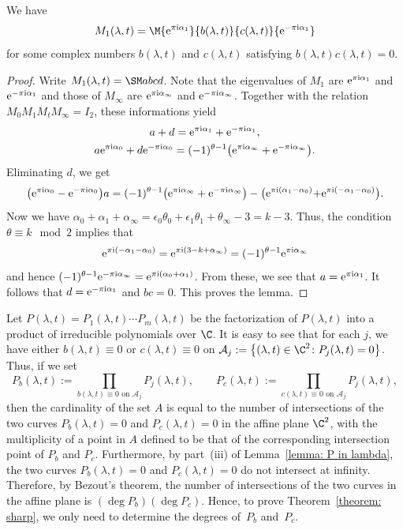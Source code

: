 \begin{Lemma} We have
\[
M_1(\lambda,t)=\M{{\rm e}^{\pi {\rm i}\alpha_1}}{b(\lambda,t)}{c(\lambda,t)}
{{\rm e}^{-\pi {\rm i}\alpha_1}}
\]
for some complex numbers $b(\lambda,t)$ and $c(\lambda,t)$ satisfying
$b(\lambda,t)c(\lambda,t)=0$.
\end{Lemma}

\begin{proof} Write $M_1(\lambda,t)=\SM abcd$. Note that the
 eigenvalues of $M_1$ are ${\rm e}^{\pi {\rm i}\alpha_1}$ and ${\rm e}^{-\pi
 {\rm i}\alpha_1}$ and those of $M_\infty$ are ${\rm e}^{\pi {\rm i}\alpha_\infty}$
 and ${\rm e}^{-\pi {\rm i}\alpha_\infty}$. Together with the relation
 $M_0M_1M_tM_\infty=I_2$, these informations yield
 \begin{gather*}
 a+d={\rm e}^{\pi {\rm i}\alpha_1}+{\rm e}^{-\pi {\rm i}\alpha_1}, \\
 a{\rm e}^{\pi {\rm i}\alpha_0}+d{\rm e}^{-\pi {\rm i}\alpha_0}
 =(-1)^{\theta-1}\bigl({\rm e}^{\pi {\rm i}\alpha_\infty}+{\rm e}^{-\pi {\rm i}\alpha_\infty}\bigr).
 \end{gather*}
 Eliminating $d$, we get
\[
 \bigl({\rm e}^{\pi {\rm i}\alpha_0}-{\rm e}^{-\pi {\rm i}\alpha_0}\bigr)a
 =(-1)^{\theta-1}\bigl({\rm e}^{\pi {\rm i}\alpha_\infty}+{\rm e}^{-\pi {\rm i}\alpha_\infty}\bigr)
 -\bigl({\rm e}^{\pi {\rm i}(\alpha_1-\alpha_0)}{+{\rm e}^{\pi {\rm i}(-\alpha_1-\alpha_0)}}\bigr).
\]
 Now we have $\alpha_0+\alpha_1+\alpha_\infty=\epsilon_0\theta_0
 +\epsilon_1\theta_1+\theta_\infty-3=k-3$. Thus, the condition
 $\theta\equiv k\mod 2$ implies that
\[
 {\rm e}^{\pi {\rm i}(-\alpha_1-\alpha_0)}={\rm e}^{\pi {\rm i}(3-k+\alpha_\infty)}
 =(-1)^{\theta-1}{\rm e}^{\pi {\rm i}\alpha_\infty}
\]
 and hence $(-1)^{\theta-1}{\rm e}^{-\pi {\rm i}\alpha_\infty}
 ={\rm e}^{\pi {\rm i}(\alpha_0+\alpha_1)}$.
 From these, we see that $a={\rm e}^{\pi {\rm i}\alpha_1}$. It follows that
 $d={\rm e}^{-\pi {\rm i}\alpha_1}$ and $bc=0$. This proves the lemma.
\end{proof}

Let $P(\lambda,t)=P_1(\lambda,t)\cdots P_m(\lambda,t)$ be
the factorization of $P(\lambda,t)$ into a product of irreducible
polynomials over $\C$. It is easy to see that for each $j$, we have
either $b(\lambda,t)\equiv 0$ or $c(\lambda,t)\equiv 0$ on $\mathcal
A_j:=\bigl\{(\lambda,t)\in\C^2\colon P_j(\lambda,t)=0\bigr\}$. Thus, if we set
\[
 P_b(\lambda,t):=\prod_{b(\lambda,t)\equiv 0\text{ on }\mathcal A_j}
 P_j(\lambda,t), \qquad
 P_c(\lambda,t):=\prod_{c(\lambda,t)\equiv 0\text{ on }\mathcal A_j}
 P_j(\lambda,t),
\]
then the cardinality of the set $A$ is equal to the number of
intersections of the two curves $P_b(\lambda,t)=0$ and
$P_c(\lambda,t)=0$ in the affine plane $\C^2$, with the multiplicity
of a point in $A$ defined to be that of the corresponding intersection
point of $P_b$ and $P_c$. Furthermore, by part~(iii) of Lemma~\ref{lemma: P in lambda}, the two curves $P_b(\lambda,t)=0$ and
$P_c(\lambda,t)=0$ do not intersect at infinity. Therefore, by
Bezout's theorem, the number of intersections of the two curves in the
affine plane is $(\deg P_b)(\deg P_c)$. Hence, to prove Theorem~\ref{theorem: sharp}, we only need to determine the degrees of~$P_b$
and~$P_c$.

